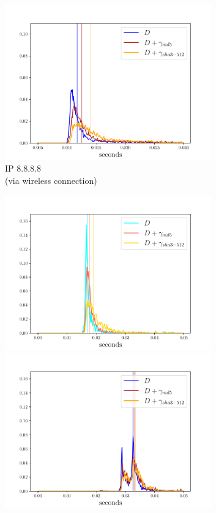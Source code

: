 \documentclass[12pt,a4paper,automark, toc=bib]{scrreprt}
\theoremstyle{definition}
\begin{document}
\begin{figure}
\begin{subfigure}{0.32\textwidth}
					\includegraphics[width=0.98\textwidth]{figures/_GOOGLE_complete_dark.pdf}
					\caption{IP 8.8.8.8\\(via wireless connection)}
				\end{subfigure}
				\centering
				\begin{subfigure}{0.32\textwidth}
					\includegraphics[width=0.98\textwidth]{figures/_MEDIUM2_complete_light.pdf}
					\includegraphics[width=0.98\textwidth]{figures/_MEDIUM2_complete_dark.pdf}

\end{subfigure}
\end{figure}
\end{document}
